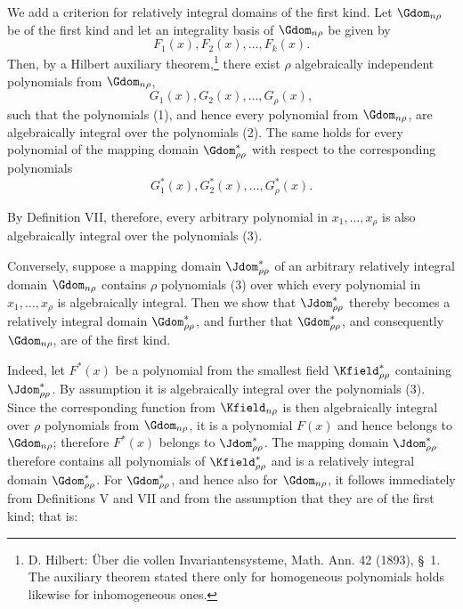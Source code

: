 \documentclass[11pt]{article}
\begin{document}
We add a criterion for relatively integral domains of the first kind. Let $\Gdom_{n\rho}$ be of the first kind and let an integrality basis of $\Gdom_{n\rho}$ be given by
\begin{equation}
  F_1(x),F_2(x),\ldots,F_k(x).
\tag{1}
\end{equation}
Then, by a Hilbert auxiliary theorem,\footnote{D. Hilbert: Über die vollen Invariantensysteme, Math. Ann. 42 (1893), \S\ 1. The auxiliary theorem stated there only for homogeneous polynomials holds likewise for inhomogeneous ones.} there exist $\rho$ algebraically independent polynomials from $\Gdom_{n\rho}$,
\begin{equation}
  G_1(x),G_2(x),\ldots,G_\rho(x),
\tag{2}
\end{equation}
such that the polynomials (1), and hence every polynomial from $\Gdom_{n\rho}$, are algebraically integral over the polynomials (2). The same holds for every polynomial of the mapping domain $\Gdom^*_{\rho\rho}$ with respect to the corresponding polynomials
\begin{equation}
  G_1^*(x),G_2^*(x),\ldots,G_\rho^*(x).
\tag{3}
\end{equation}

By Definition VII, therefore, every arbitrary polynomial in $x_1,
\ldots,x_\rho$ is also algebraically integral over the polynomials (3).

Conversely, suppose a mapping domain $\Jdom^*_{\rho\rho}$ of an arbitrary relatively integral domain $\Gdom_{n\rho}$ contains $\rho$ polynomials (3) over which every polynomial in $x_1,
\ldots,x_\rho$ is algebraically integral. Then we show that $\Jdom^*_{\rho\rho}$ thereby becomes a relatively integral domain $\Gdom^*_{\rho\rho}$, and further that $\Gdom^*_{\rho\rho}$, and consequently $\Gdom_{n\rho}$, are of the first kind.

Indeed, let $F^*(x)$ be a polynomial from the smallest field $\Kfield^*_{\rho\rho}$ containing $\Jdom^*_{\rho\rho}$. By assumption it is algebraically integral over the polynomials (3). Since the corresponding function from $\Kfield_{n\rho}$ is then algebraically integral over $\rho$ polynomials from $\Gdom_{n\rho}$, it is a polynomial $F(x)$ and hence belongs to $\Gdom_{n\rho}$; therefore $F^*(x)$ belongs to $\Jdom^*_{\rho\rho}$. The mapping domain $\Jdom^*_{\rho\rho}$ therefore contains all polynomials of $\Kfield^*_{\rho\rho}$ and is a relatively integral domain $\Gdom^*_{\rho\rho}$. For $\Gdom^*_{\rho\rho}$, and hence also for $\Gdom_{n\rho}$, it follows immediately from Definitions V and VII and from the assumption that they are of the first kind; that is:
\end{document}
